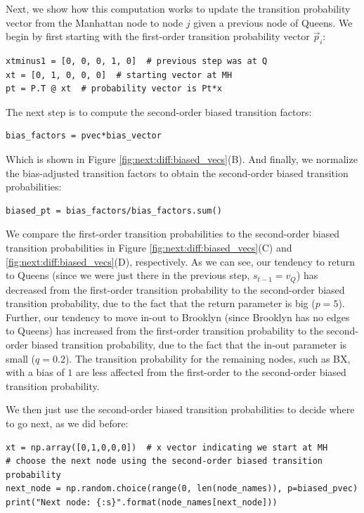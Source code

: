 Next, we show how this computation works to update the transition probability vector from the Manhattan node to node $j$ given a previous node of Queens. We begin by first starting with the first-order transition probability vector $\vec p_i$:

\begin{lstlisting}[style=python]
xtminus1 = [0, 0, 0, 1, 0]  # previous step was at Q
xt = [0, 1, 0, 0, 0]  # starting vector at MH
pt = P.T @ xt  # probability vector is Pt*x
\end{lstlisting}

The next step is to compute the second-order biased transition factors:

\begin{lstlisting}[style=python]
bias_factors = pvec*bias_vector
\end{lstlisting}

Which is shown in Figure \ref{fig:next:diff:biased_vecs}(B). And finally, we normalize the bias-adjusted transition factors to obtain the second-order biased transition probabilities:

\begin{lstlisting}[style=python]
biased_pt = bias_factors/bias_factors.sum()
\end{lstlisting}

We compare the first-order transition probabilities to the second-order biased transition probabilities in Figure \ref{fig:next:diff:biased_vecs}(C) and \ref{fig:next:diff:biased_vecs}(D), respectively. As we can see, our tendency to return to Queens (since we were just there in the previous step, $s_{t-1} = v_{Q}$) has decreased from the first-order transition probability to the second-order biased transition probability, due to the fact that the return parameter is big ($p = 5$). Further, our tendency to move in-out to Brooklyn (since Brooklyn has no edges to Queens) has increased from the first-order transition probability to the second-order biased transition probability, due to the fact that the in-out parameter is small ($q = 0.2$). The transition probability for the remaining nodes, such as BX, with a bias of $1$ are less affected from the first-order to the second-order biased transition probability.

We then just use the second-order biased transition probabilities to decide where to go next, as we did before:

\begin{lstlisting}[style=python]
xt = np.array([0,1,0,0,0])  # x vector indicating we start at MH
# choose the next node using the second-order biased transition probability
next_node = np.random.choice(range(0, len(node_names)), p=biased_pvec)
print("Next node: {:s}".format(node_names[next_node]))
\end{lstlisting}

